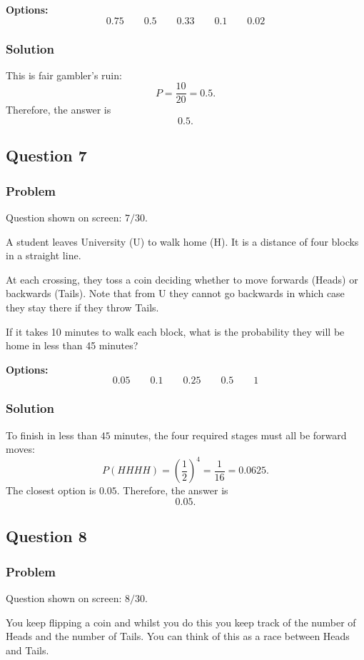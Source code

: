 \documentclass[12pt]{article}
\begin{document}
\noindent\textbf{Options:}
\[
\boxed{0.75}
\qquad
\boxed{0.5}
\qquad
\boxed{0.33}
\qquad
\boxed{0.1}
\qquad
\boxed{0.02}
\]

\subsubsection{Solution}
This is fair gambler's ruin:
\[
P=\frac{10}{20}=0.5.
\]
Therefore, the answer is
\[
\boxed{0.5}.
\]

\subsection{Question 7}
\subsubsection{Problem}
Question shown on screen: \(7/30\).

A student leaves University (U) to walk home (H). It is a distance of four blocks in a straight line.

At each crossing, they toss a coin deciding whether to move forwards (Heads) or backwards (Tails). Note that from U they cannot go backwards in which case they stay there if they throw Tails.

If it takes 10 minutes to walk each block, what is the probability they will be home in less than 45 minutes?

\noindent\textbf{Options:}
\[
\boxed{0.05}
\qquad
\boxed{0.1}
\qquad
\boxed{0.25}
\qquad
\boxed{0.5}
\qquad
\boxed{1}
\]

\subsubsection{Solution}
To finish in less than \(45\) minutes, the four required stages must all be forward moves:
\[
P(HHHH)=\left(\frac12\right)^4=\frac{1}{16}=0.0625.
\]
The closest option is \(0.05\). Therefore, the answer is
\[
\boxed{0.05}.
\]

\subsection{Question 8}
\subsubsection{Problem}
Question shown on screen: \(8/30\).

You keep flipping a coin and whilst you do this you keep track of the number of Heads and the number of Tails. You can think of this as a race between Heads and Tails.
\end{document}
